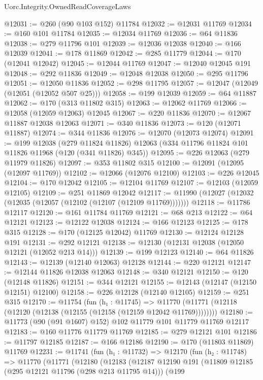 \begin{lexlean}{Uorc.Integrity.OwnedReadCoverageLaws}
\begin{coremodule}
@12031 := @260 (@90 @103 @152) @11784
@12032 := @12031 @11769
@12034 := @160 @101 @11784
@12035 := @12034 @11769
@12036 := @64 @11836
@12038 := @279 @11796 @101
@12039 := @12036 @12038
@12040 := @166 @12039
@12041 := @178 @11869
@12042 := @285 @11779
@12044 := @170 (@12041 @12042)
@12045 := @12044 @11769
@12047 := @12040 @12045 @191
@12048 := @292 @11836
@12049 := @12048 @12038
@12050 := @295 @11796
@12051 := @12050 @11836
@12052 := @298 @11795
@12057 := @12047 (@12049 (@12051 (@12052 @507 @25)))
@12058 := @199 @12039
@12059 := @64 @11887
@12062 := @170 (@313 @11802 @315)
@12063 := @12062 @11769
@12066 := @12058 (@12059 @12063) @12045
@12067 := @220 @11836
@12070 := @12067 @11887 @12038 @12063
@12071 := @340 @11836
@12073 := @120 (@12071 @11887)
@12074 := @344 @11836
@12076 := @12070 (@12073 @12074)
@12091 := @199
    @12038
    (@279 @11824 @11826)
    @12063
    (@334 @11796 @11824 @101 @11826 @11968 (@120 (@341 @11826) @345))
@12095 := @226 @12063 (@279 @11979 @11826)
@12097 := @353 @11802 @315
@12100 := @12091 (@12095 (@12097 @11769))
@12102 := @12066 (@12076 @12100)
@12103 := @226 @12045
@12104 := @170 @12042
@12105 := @12104 @11769
@12107 := @12103 (@12059 @12105)
@12109 := @251 @11869 @12042
@12117 := @11990 (@12027 (@12032 (@12035 (@12057 (@12102 (@12107 (@12109 @11769)))))))
@12118 := @11786 @12117
@12120 := @161 @11784 @11769
@12121 := @68 @213
@12122 := @64 @12121
@12123 := @12122 @12038
@12124 := @166 @12123
@12125 := @178 @315
@12128 := @170 (@12125 @12042) @11769
@12130 := @12124 @12128 @191
@12131 := @292 @12121
@12138 := @12130 (@12131 @12038 (@12050 @12121 (@12052 @213 @14)))
@12139 := @199 @12123
@12140 := @64 @11826
@12143 := @12139 (@12140 @12063) @12128
@12144 := @220 @12121
@12147 := @12144 @11826 @12038 @12063
@12148 := @340 @12121
@12150 := @120 (@12148 @11826)
@12151 := @344 @12121
@12155 := @12143 (@12147 (@12150 @12151) @12100)
@12158 := @226 @12128 (@12140 @12105)
@12159 := @251 @315
@12170 := @11754
    (fun (h₁ : @11745) =>
    @11770 (@11771 (@12118 (@12120 (@12138 (@12155 (@12158 (@12159 @12042 @11769))))))))
@12180 := @11773 (@90 (@91 @1607) @152) @102 @11779 @101 @11779 @11769 @12117
@12183 := @160 @11776 @11779 @11769
@12185 := @279 @12121 @101
@12186 := @11797 @12185
@12187 := @166 @12186
@12190 := @170 (@11803 @11869) @11769
@12231 := @11741
    (fun (h₁ : @11732) =>
    @12170
      (fun (h₂ : @11748) =>
      @11770
        (@11771
          (@12180
            (@12183
              (@12187
                @12190
                @191
                (@11809 @12185 (@295 @12121 @11796 (@298 @213 @11795 @14)))
                (@199

\end{coremodule}
\end{lexlean}
